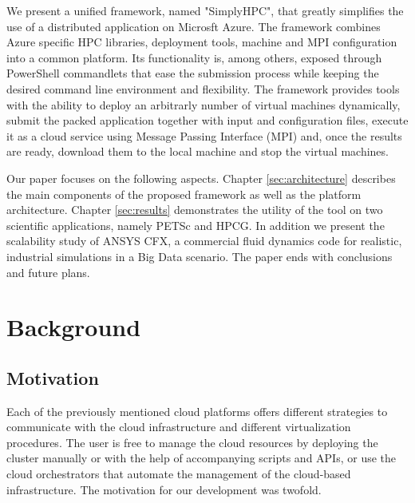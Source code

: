 \documentclass[3p,times]{elsarticle}
\begin{document}
We present a unified framework, named "SimplyHPC",  that greatly simplifies the use of a distributed application on Microsft Azure. The framework combines Azure specific HPC libraries, deployment tools, machine and MPI configuration into a common platform. Its functionality is, among others, exposed through PowerShell commandlets that ease the submission process while keeping the desired command line environment and flexibility. The framework provides tools with the ability to deploy an arbitrarly number of virtual machines dynamically, submit the packed application together with input and configuration files, execute it as a cloud service using Message Passing Interface (MPI) and, once the results are ready, download them to the local machine and stop the virtual machines. 

Our paper focuses on the following aspects. Chapter \ref{sec:architecture} describes the main components of the proposed framework as well as the platform architecture. Chapter \ref{sec:results} demonstrates the utility of the tool on two scientific applications, namely PETSc and HPCG. In addition we present the scalability study of ANSYS CFX, a commercial fluid dynamics code for realistic, industrial simulations in a Big Data scenario. The paper ends with conclusions and future plans.




\section{Background}
\label{sec:background}
\subsection{Motivation}

Each of the previously mentioned cloud platforms offers different strategies to communicate with the cloud infrastructure and different virtualization procedures. The user is free to manage the cloud resources by deploying the cluster manually or with the help of accompanying scripts and APIs, or use the cloud orchestrators that automate the management of the cloud-based infrastructure. The motivation for our development was twofold.
\end{document}
